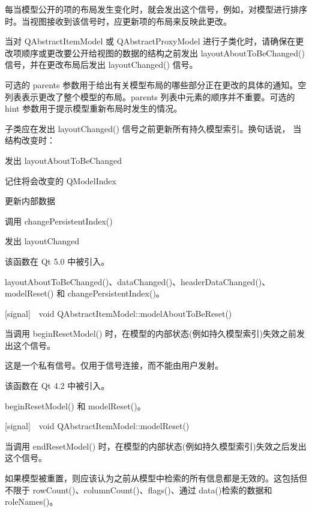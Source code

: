 每当模型公开的项的布局发生变化时，就会发出这个信号，例如，对模型进行排序时。当视图接收到该信号时，应更新项的布局来反映此更改。

当对 QAbstractItemModel 或 QAbstractProxyModel 进行子类化时，请确保在更改项顺序或更改要公开给视图的数据的结构之前发出 layoutAboutToBeChanged() 信号，并在更改布局后发出 layoutChanged() 信号。

可选的 parents 参数用于给出有关模型布局的哪些部分正在更改的具体的通知。空列表表示更改了整个模型的布局。parents 列表中元素的顺序并不重要。可选的 hint 参数用于提示模型重新布局时发生的情况。

子类应在发​​出 layoutChanged() 信号之前更新所有持久模型索引。换句话说，
当结构改变时：

\begin{compactitem}
\item 发出 layoutAboutToBeChanged
\item 记住将会改变的 QModelIndex
\item 更新内部数据
\item 调用 changePersistentIndex()
\item 发出 layoutChanged
\end{compactitem}

该函数在 Qt 5.0 中被引入。

\begin{seeAlso}
layoutAboutToBeChanged()、dataChanged()、headerDataChanged()、modelReset() 和 changePersistentIndex()。
\end{seeAlso}

[signal] void QAbstractItemModel::modelAboutToBeReset()

当调用 beginResetModel() 时，在模型的内部状态(例如持久模型索引)失效之前发出这个信号。

\begin{notice}
这是一个私有信号。仅用于信号连接，而不能由用户发射。
\end{notice}

该函数在 Qt 4.2 中被引入。

\begin{seeAlso}
beginResetModel() 和 modelReset()。
\end{seeAlso}

[signal] void QAbstractItemModel::modelReset()

当调用 endResetModel() 时，在模型的内部状态(例如持久模型索引)失效之后发出这个信号。

\begin{notice}
如果模型被重置，则应该认为之前从模型中检索的所有信息都是无效的。这包括但不限于 rowCount()、columnCount()、flags()、通过 data()检索的数据和 roleNames()。
\end{notice}

